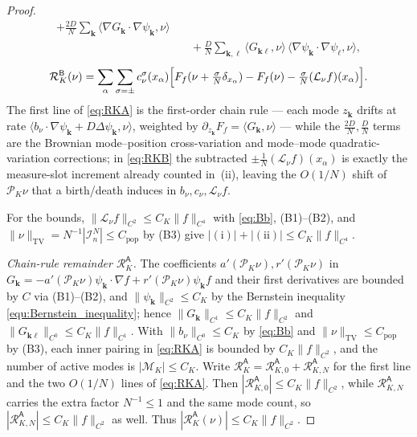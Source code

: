 \documentclass[a4paper,fleqn]{cas-sc}
\theoremstyle{definition}
\theoremstyle{remark}
\begin{document}
\begin{proof}
\begin{equation}
\begin{aligned}
 +\frac{2D}N\sum_{\mathbf k}\langle\nabla G_{\mathbf k}\!\cdot\!\nabla\psi_{\mathbf k},\nu\rangle\\
&\quad
 +\frac{D}N\sum_{\mathbf k,\ell}\langle G_{\mathbf k\ell},\nu\rangle\,
   \langle\nabla\psi_{\mathbf k}\!\cdot\!\nabla\psi_\ell,\nu\rangle,
\end{aligned}
\end{equation}
\begin{equation}\label{eq:RKB}
\mathcal R_K^{\mathsf B}(\nu)
=\sum_\alpha\sum_{\sigma=\pm}c^\sigma_\nu(x_\alpha)
   \Bigl[F_f(\nu+\tfrac{\sigma}N\delta_{x_\alpha})-F_f(\nu)-\tfrac{\sigma}N(\mathcal L_\nu f)(x_\alpha)\Bigr].
\end{equation}
The first line of \eqref{eq:RKA} is the first-order chain rule --- each mode $z_{\mathbf k}$ drifts at
rate $\langle b_\nu\!\cdot\!\nabla\psi_{\mathbf k}+D\Delta\psi_{\mathbf k},\nu\rangle$, weighted by
$\partial_{z_{\mathbf k}}F_f=\langle G_{\mathbf k},\nu\rangle$ --- while the $\tfrac{2D}N,\tfrac DN$ terms are
the Brownian mode--position cross-variation and mode--mode quadratic-variation corrections; in
\eqref{eq:RKB} the subtracted $\pm\tfrac1N(\mathcal L_\nu f)(x_\alpha)$ is exactly the measure-slot
increment already counted in~(ii), leaving the $O(1/N)$ shift of $\mathcal P_K\nu$ that a birth/death
induces in $b_\nu,c_\nu,\mathcal L_\nu f$.

For the bounds, $\|\mathcal L_\nu f\|_{C^2}\le C_K\|f\|_{C^4}$ with \eqref{eq:Bb}, (B1)--(B2), and
$\|\nu\|_{\mathrm{TV}}=N^{-1}|\mathcal I^N_n|\le C_{\mathrm{pop}}$ by (B3) give $|(\mathrm i)|+|(\mathrm{ii})|\le C_K\|f\|_{C^4}$.

\emph{Chain-rule remainder $\mathcal R_K^{\mathsf A}$.} The coefficients
$a'(\mathcal P_K\nu),r'(\mathcal P_K\nu)$ in $G_{\mathbf k}=-a'(\mathcal P_K\nu)\psi_{\mathbf k}\!\cdot\!\nabla f+r'(\mathcal P_K\nu)\psi_{\mathbf k}f$
and their first derivatives are bounded by $C$ via (B1)--(B2), and
$\|\psi_{\mathbf k}\|_{C^2}\le C_K$ by the Bernstein inequality \eqref{equ:Bernstein_inequality};
hence $\|G_{\mathbf k}\|_{C^1}\le C_K\|f\|_{C^2}$ and $\|G_{\mathbf k\ell}\|_{C^0}\le C_K\|f\|_{C^1}$.
With $\|b_\nu\|_{C^0}\le C_K$ by \eqref{eq:Bb} and $\|\nu\|_{\mathrm{TV}}\le C_{\mathrm{pop}}$ by (B3), each
inner pairing in \eqref{eq:RKA} is bounded by $C_K\|f\|_{C^2}$, and the number of active modes is
$|\mathcal M_K|\le C_K$. Write $\mathcal R_K^{\mathsf A}=\mathcal R_{K,0}^{\mathsf A}+\mathcal R_{K,N}^{\mathsf A}$
for the first line and the two $O(1/N)$ lines of \eqref{eq:RKA}. Then
$|\mathcal R_{K,0}^{\mathsf A}|\le C_K\|f\|_{C^2}$, while $\mathcal R_{K,N}^{\mathsf A}$ carries the extra
factor $N^{-1}\le1$ and the same mode count, so $|\mathcal R_{K,N}^{\mathsf A}|\le C_K\|f\|_{C^2}$ as well.
Thus $|\mathcal R_K^{\mathsf A}(\nu)|\le C_K\|f\|_{C^2}$.


\end{proof}
\end{document}
